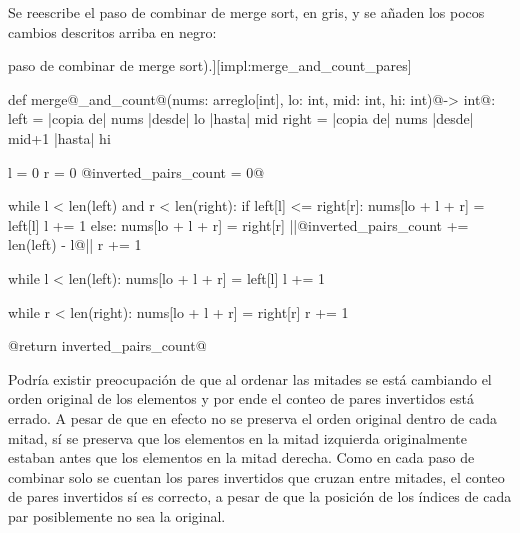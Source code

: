 Se reescribe el paso de combinar de merge sort, en gris, y se añaden los pocos cambios descritos arriba en negro:
\begin{codeblock}[Combinar y contar pares invertidos (en gris: \hyperref[impl:merge]{paso de combinar de merge sort}).][impl:merge_and_count_pares]
\begin{pseudocode}[style=derived]
def merge@_and_count@(nums: arreglo[int], lo: int, mid: int, hi: int)@-> int@:
    left = |\textrm{copia de}| nums |\textrm{desde}| lo |\textrm{hasta}| mid
    right = |\textrm{copia de}| nums |\textrm{desde}| mid+1 |\textrm{hasta}| hi

    l = 0
    r = 0
    @inverted_pairs_count = 0@

    while l < len(left) and r < len(right):
        if left[l] <= right[r]:
            nums[lo + l + r] = left[l]
            l += 1
        else:
            nums[lo + l + r] = right[r]
            ||@inverted_pairs_count += len(left) - l@||
            r += 1

    while l < len(left):
        nums[lo + l + r] = left[l]
        l += 1

    while r < len(right):
        nums[lo + l + r] = right[r]
        r += 1

    @return inverted_pairs_count@
\end{pseudocode}
\begin{annotations}
\end{annotations}
\end{codeblock}

Podría existir preocupación de que al ordenar las mitades se está cambiando el orden original de los elementos y por ende el conteo de pares invertidos está errado. A pesar de que en efecto no se preserva el orden original dentro de cada mitad, sí se preserva que los elementos en la mitad izquierda originalmente estaban antes que los elementos en la mitad derecha. Como en cada paso de combinar solo se cuentan los pares invertidos que cruzan entre mitades, el conteo de pares invertidos sí es correcto, a pesar de que la posición de los índices de cada par posiblemente no sea la original.

